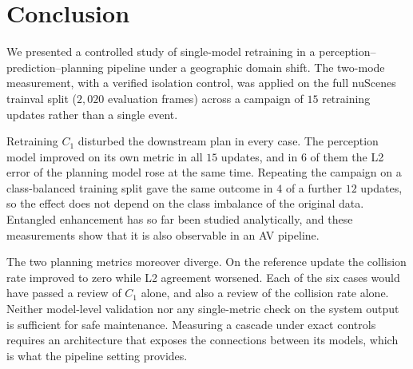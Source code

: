 \documentclass[conference]{IEEEtran}
\begin{document}
\section{Conclusion}
\label{sec:conclusion}
We presented a controlled study of single-model retraining in a
perception--prediction--planning pipeline under a geographic domain shift. The
two-mode measurement, with a verified isolation control, was applied on the full
nuScenes trainval split ($2{,}020$ evaluation frames) across a campaign of $15$
retraining updates rather than a single event.

Retraining $C_1$ disturbed the downstream plan in every case. The perception model
improved on its own metric in all $15$ updates, and in $6$ of them the L2 error
of the planning model rose at the same time. Repeating the campaign on a class-balanced
training split gave the same outcome in $4$ of a further $12$ updates, so the
effect does not depend on the class imbalance of the original data. Entangled
enhancement has so far been studied analytically, and these measurements show
that it is also observable in an AV pipeline.

The two planning metrics moreover diverge. On the reference update the collision
rate improved to zero while L2 agreement worsened. Each of the six cases would
have passed a review of $C_1$ alone, and also a review of the collision
rate alone. Neither model-level validation nor any single-metric check on the
system output is sufficient for safe maintenance. Measuring a cascade under exact
controls requires an architecture that exposes the connections between its
models, which is what the pipeline setting provides.



\end{document}
